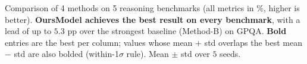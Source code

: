 \caption{Comparison of 4 methods on 5 reasoning benchmarks (all metrics in \%, higher is better). \textbf{OursModel achieves the best result on every benchmark}, with a lead of up to $5.3$ pp over the strongest baseline (Method-B) on GPQA. \textbf{Bold} entries are the best per column; values whose mean $+$ std overlaps the best mean $-$ std are also bolded (within-1$\sigma$ rule). Mean $\pm$ std over $5$ seeds.}
